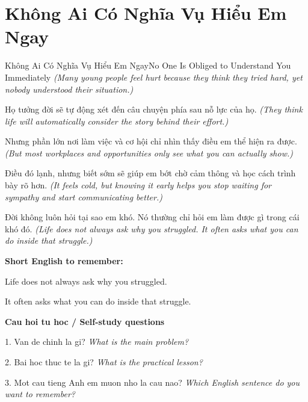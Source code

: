 \section{Không Ai Có Nghĩa Vụ Hiểu Em Ngay}
\begin{truyen}{Không Ai Có Nghĩa Vụ Hiểu Em Ngay}{No One Is Obliged to Understand You Immediately}
\textit{(Many young people feel hurt because they think they tried hard, yet nobody understood their situation.)}

Họ tưởng đời sẽ tự động xét đến câu chuyện phía sau nỗ lực của họ.
\textit{(They think life will automatically consider the story behind their effort.)}

Nhưng phần lớn nơi làm việc và cơ hội chỉ nhìn thấy điều em thể hiện ra được.
\textit{(But most workplaces and opportunities only see what you can actually show.)}

Điều đó lạnh, nhưng biết sớm sẽ giúp em bớt chờ cảm thông và học cách trình bày rõ hơn.
\textit{(It feels cold, but knowing it early helps you stop waiting for sympathy and start communicating better.)}

\end{truyen}

\begin{baihoc}
Đời không luôn hỏi tại sao em khó. Nó thường chỉ hỏi em làm được gì trong cái khó đó.
\textit{(Life does not always ask why you struggled. It often asks what you can do inside that struggle.)}
\end{baihoc}

\begin{ghinhoanh}
\textbf{Short English to remember:}

Life does not always ask why you struggled.

It often asks what you can do inside that struggle.

\end{ghinhoanh}

\begin{tuhocnhanh}
\textbf{Cau hoi tu hoc / Self-study questions}

1. Van de chinh la gi? \textit{What is the main problem?}

2. Bai hoc thuc te la gi? \textit{What is the practical lesson?}

3. Mot cau tieng Anh em muon nho la cau nao? \textit{Which English sentence do you want to remember?}
\end{tuhocnhanh}
\ngancach

